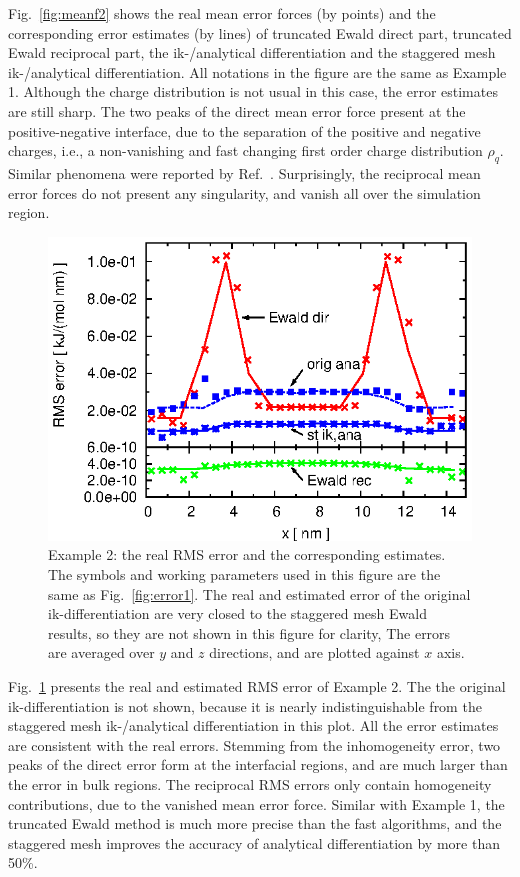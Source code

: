 \documentclass[aps,pre,preprint,unsortedaddress]{revtex4}
\newcommand{\redc}[1]{{\color{red} #1}}
\begin{document}
Fig.~\ref{fig:meanf2} shows the real mean error forces (by points) and the
corresponding error estimates (by lines) of \redc{truncated} Ewald direct
part, truncated Ewald reciprocal part, the ik-/analytical
differentiation 
and the staggered mesh ik-/analytical differentiation. All
notations in the figure are the same as Example 1.  Although the
charge distribution is not usual in this case, the error estimates are still
sharp. The two peaks of the direct mean  error force present at the
positive-negative interface, due to the separation of the positive
and negative charges, i.e., a non-vanishing and fast changing first order charge
distribution $\rho_q$.  Similar phenomena \redc{were} reported by
Ref.~\cite{wang2012}. Surprisingly, 
the reciprocal mean error forces
do not present any singularity, and vanish
all over the simulation region.

\begin{figure}
  \centering
  \includegraphics[]{fig.rand2.error.eps}
  \caption{
    Example 2: the real RMS error and the corresponding
    estimates.
    The symbols and working parameters used in this figure are the same as
    Fig.~\ref{fig:error1}.
    The real and estimated error of the original ik-differentiation
    are very closed to the staggered mesh Ewald results, so
    they are not shown in this figure for clarity, 
    The errors are averaged over $y$ and $z$ directions, and are
    plotted against $x$ axis.
  }
  \label{fig:error2}
\end{figure}

Fig.~\ref{fig:error2} presents the real and estimated
RMS error of Example 2. The
the original ik-differentiation is not
shown, because it is nearly indistinguishable from the staggered
mesh ik-/analytical differentiation in this plot.
All the error estimates \redc{are consistent with} the real errors.
Stemming from the inhomogeneity error,
two peaks of the direct error form at the interfacial
regions, and are much larger than the error in bulk
regions.
The reciprocal RMS errors only contain homogeneity contributions,
due to the vanished mean error force.
Similar with Example 1, the truncated Ewald
method is much more precise than the fast algorithms, and the
staggered mesh improves the accuracy of analytical
differentiation by more than 50\%.
\end{document}
